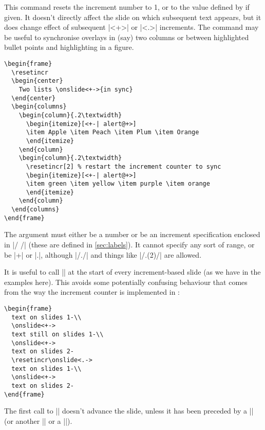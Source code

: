 \documentclass[a4paper]{ltxdoc}
\begin{document}
\begin{command}{\resetincr{}}
  This command resets the increment number to 1, or to the value defined by
   if given.  It doesn't directly affect the slide on which
  subsequent text appears, but it does change effect of subsequent |<+>| or
  |<.>| increments.  The command may be useful to synchronise overlays in (say)
  two columns or between highlighted bullet points and highlighting in a figure.
  \example
\begin{verbatim}
\begin{frame}
  \resetincr
  \begin{center}
    Two lists \onslide<+->{in sync}
  \end{center}
  \begin{columns}
    \begin{column}{.2\textwidth}
      \begin{itemize}[<+-| alert@+>]
      \item Apple \item Peach \item Plum \item Orange
      \end{itemize}
    \end{column}
    \begin{column}{.2\textwidth}
      \resetincr[2] % restart the increment counter to sync
      \begin{itemize}[<+-| alert@+>]
      \item green \item yellow \item purple \item orange
      \end{itemize}
    \end{column}
  \end{columns}
\end{frame}
\end{verbatim}
The argument  must either be a number or be an increment
specification enclosed in |/ /| (these are defined in \cref{sec:labels}).  It cannot specify any
sort of range, or be |+| or |.|, although |/./| and things like |/.(2)/| are
allowed.

It is useful to call |\resetincr| at the start of every increment-based slide
(as we have in the examples here).  This avoids some potentially confusing
behaviour that comes from the way the increment counter is implemented in
\beamer:
\example
\begin{verbatim}
\begin{frame}
  text on slides 1-\\
  \onslide<+->
  text still on slides 1-\\
  \onslide<+->
  text on slides 2-
  \resetincr\onslide<.->
  text on slides 1-\\
  \onslide<+->
  text on slides 2-
\end{frame}
\end{verbatim}
The first call to |\onslide<+->| doesn't advance the slide, unless it has been
preceded by a |\resetincr| (or another |\onslide<+->| or a |\pause|).
\end{command}
\end{document}
